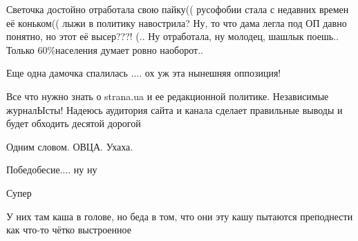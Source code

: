 \begin{itemize}
Светочка достойно отработала свою пайку(( русофобии стала с недавних времен её
коньком(( лыжи в политику навострила? Ну, то что дама легла под ОП давно
понятно, но этот её высер???! (.. Ну отработала, ну молодец, шашлык поешь..
Только 60\%населения думает ровно наоборот..

 
Еще одна дамочка спалилась .... ох уж эта нынешняя оппозиция!

 

Все что нужно знать о strana.ua и ее редакционной политике. Независимые
журналЫсты! Надеюсь аудитория сайта и канала сделает правильные выводы и будет
обходить десятой дорогой


 

Одним словом. ОВЦА. Ухаха.


 

Победобесие.... ну ну

 

Супер

У них там каша в голове, но беда в том, что они эту кашу пытаются преподнести
как что-то чётко выстроенное

 

\end{itemize}
